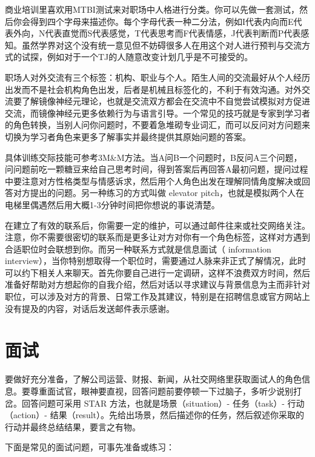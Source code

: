 \documentclass[]{tufte-book}
\begin{document}
商业培训里喜欢用MTBI测试来对职场中人格进行分类。你可以先做一套测试，然后你会得到四个字母来描述你。每个字母代表一种二分法，例如I代表内向而E代表外向，N代表直觉而S代表感觉，T代表思考而F代表情感，J代表判断而P代表感知。虽然学界对这个没有统一意见但不妨碍很多人在用这个对人进行预判与交流方式的试探，例如对于一个TJ的人随意改变计划几乎是不可接受的。

职场人对外交流有三个标签：机构、职业与个人。陌生人间的交流最好从个人经历出发而不是社会机构角色出发，后者是机械且标签化的，不利于有效沟通。对外交流要了解镜像神经元理论，也就是交流双方都会在交流中不自觉尝试模拟对方促进交流，而镜像神经元更多依赖行为与语言引导。一个常见的技巧就是专家到学习者的角色转换，当别人问你问题时，不要着急堆砌专业词汇，而可以反问对方问题来切换为学习者角色来更多了解事实并最终提供其原始问题的答案。

具体训练交际技能可参考3M\&M方法。当A问B一个问题时，B反问A三个问题，问问题前吃一颗糖豆来给自己思考时间，得到答案后再回答A最初问题，提问过程中要注意对方性格类型与情感诉求，然后用个人角色出发在理解同情角度解决或回答对方提出的问题。另一种练习的方式叫做 elevator pitch，也就是模拟两个人在电梯里偶遇然后用大概1-3分钟时间把你想说的事说清楚。

在建立了有效的联系后，你需要一定的维护，可以通过邮件往来或社交网络关注。注意，你不需要很密切的联系而是更多让对方对你有一个角色标签，这样对方遇到合适职位时会联想到你。而另一种联系方式就是信息面试（ information interview），当你特别想取得一个职位时，需要通过人脉来非正式了解情况，此时可以约下相关人来聊天。首先你要自己进行一定调研，这样不浪费双方时间，然后准备好帮助对方想起你的自我介绍，然后对话以寻求建议与背景信息为主而非针对职位，可以涉及对方的背景、日常工作及其建议，特别是在招聘信息或官方网站上没有提及的内容，对话后发送邮件表示感谢。

\hypertarget{ux9762ux8bd5}{%
\section{面试}\label{ux9762ux8bd5}}

要做好充分准备，了解公司运营、财报、新闻，从社交网络里获取面试人的角色信息。要尊重面试官，眼神要直视，回答问题前要停顿一下过脑子，多听少说别打岔。回答问题可采用 STAR 方法，也就是场景（situation）- 任务（task）- 行动（action）- 结果（result）。先给出场景，然后描述你的任务，然后叙述你采取的行动并最终总结结果，要言之有物。

下面是常见的面试问题，可事先准备或练习：
\end{document}
